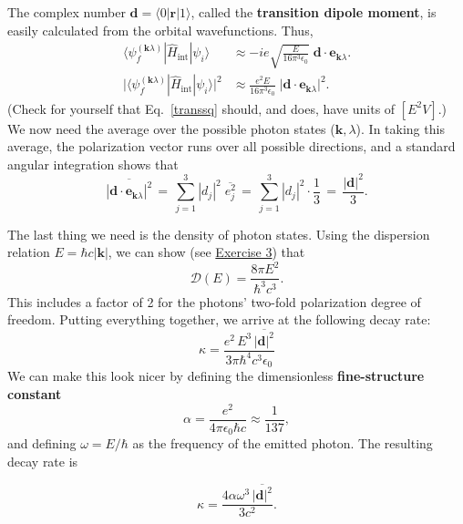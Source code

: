 \documentclass[pra,12pt]{revtex4}
\begin{document}
The complex number $\mathbf{d} = \langle 0 |\mathbf{r} | 1\rangle$,
called the \textbf{transition dipole moment}, is easily calculated
from the orbital wavefunctions.  Thus,
\begin{align}
  \langle \psi_{f}^{(\mathbf{k}\lambda)}| \hat{H}_{\mathrm{int}}|\psi_i\rangle
  &\approx - ie \sqrt{\frac{E}{16\pi^3\epsilon_0}}\;
  \mathbf{d}\cdot \mathbf{e}_{\mathbf{k}\lambda}. \\
  \big| \langle \psi_{f}^{(\mathbf{k}\lambda)}| \hat{H}_{\mathrm{int}}
  |\psi_i\rangle\big|^2
  &\approx \frac{e^2E}{16\pi^3\epsilon_0}\;
  \big|\mathbf{d}\cdot \mathbf{e}_{\mathbf{k}\lambda}\big|^2.
  \label{transsq}
\end{align}
(Check for yourself that Eq.~\eqref{transsq} should, and does, have
units of $[E^2V]$.)  We now need the average over the possible photon
states ($\mathbf{k}, \lambda$).  In taking this average, the
polarization vector runs over all possible directions, and a standard
angular integration shows that
\begin{equation}
  \overline{|\mathbf{d}\cdot \mathbf{e}_{\mathbf{k}\lambda}|^2}
  \,=\, \sum_{j=1}^3 |d_j|^2 \;\overline{e_j^2}
  \,=\, \sum_{j=1}^3 |d_j|^2 \cdot \frac{1}{3}
  \,=\, \frac{|\mathbf{d}|^2}{3}.
\end{equation}

The last thing we need is the density of photon states.  Using the
dispersion relation $E = \hbar c |\mathbf{k}|$, we can show (see
\hyperref[ex:DE]{Exercise 3}) that
\begin{equation}
  \mathcal{D}(E) = \frac{8\pi E^2}{\hbar^3c^3}.
  \label{DE}
\end{equation}
This includes a factor of 2 for the photons' two-fold polarization
degree of freedom.  Putting everything together, we arrive at the
following decay rate:
\begin{equation}
  \kappa = \frac{e^2\, E^3\, \overline{|\mathbf{d}|^2}}{3\pi\hbar^4c^3\epsilon_0}
\end{equation}
We can make this look nicer by defining the dimensionless
\textbf{fine-structure constant}
\begin{equation}
  \alpha = \frac{e^2}{4\pi\epsilon_0\hbar c} \approx \frac{1}{137},
  \label{alpha}
\end{equation}
and defining $\omega = E / \hbar$ as the frequency of the emitted
photon.  The resulting decay rate is
\begin{framed}
  \begin{equation}
    \kappa = \frac{4 \alpha \omega^3\, \overline{|\mathbf{d}|^2}}{3c^2}.
  \end{equation}
\end{framed}
\end{document}
